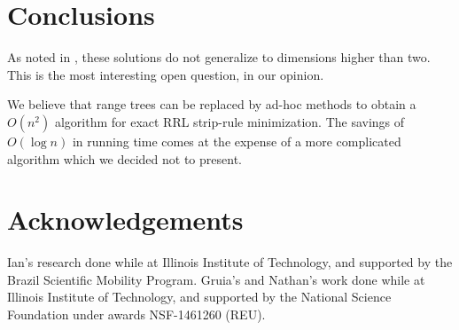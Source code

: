\section{Conclusions}
\label{s_conc}
As noted in \cite{NLT13,NLT18}, these solutions do not generalize to
dimensions higher than two. This is the most interesting open question,
in our opinion.

We believe that range trees can be replaced by ad-hoc methods to
obtain a $O(n^2)$ algorithm for exact RRL strip-rule minimization.
The savings of $O(\log n)$ in running time comes at the expense
of a more complicated algorithm which we decided not to present.

\section*{Acknowledgements}
Ian's research done while at Illinois Institute of Technology, and supported by the Brazil Scientific Mobility Program.  
Gruia's and Nathan's work done while at Illinois Institute of Technology,
and supported by the National Science Foundation under awards NSF-1461260 (REU).

